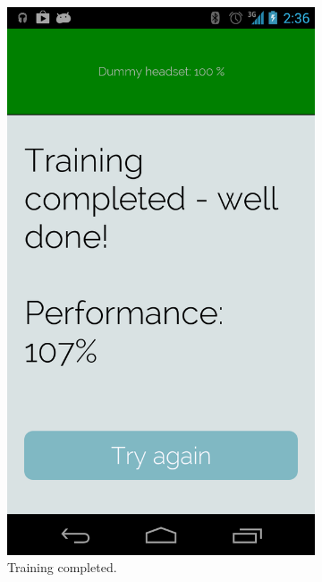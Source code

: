 \documentclass[a4paper,10pt,english,lof,lot,twoside]{puthesis}
\begin{document}
\begin{figure}
\begin{subfigure}[t]{0.30\linewidth}
\includegraphics[width=0.800\linewidth]{final-prototype-training-completed.png}
\caption[Training completed]{Training completed.}\label{ch-design/index:fig-final-prototype-app-flow-training-completed}\end{subfigure}
\begin{subfigure}[t]{0.30\linewidth}
\centering
\capstart


\end{subfigure}
\end{figure}
\end{document}
